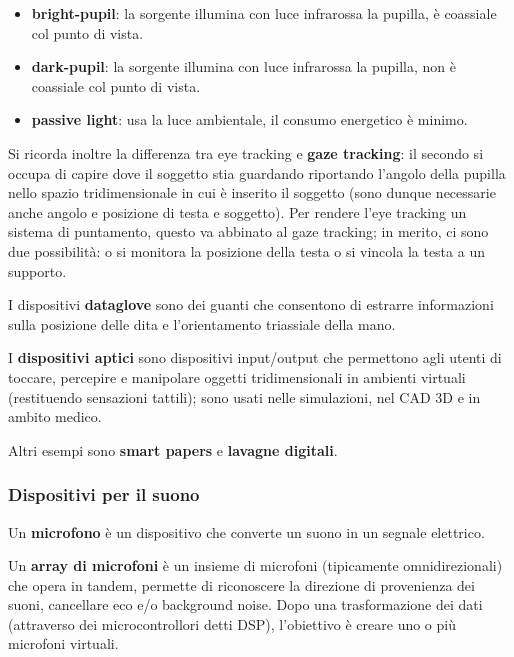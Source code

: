 \begin{itemize}
	\itemsep-0.3em
	\item \textbf{bright-pupil}: la sorgente illumina con luce infrarossa la pupilla, è coassiale col punto di vista.
	\item \textbf{dark-pupil}: la sorgente illumina con luce infrarossa la pupilla, non è coassiale col punto di vista.
	\item \textbf{passive light}: usa la luce ambientale, il consumo energetico è minimo.
\end{itemize}

Si ricorda inoltre la differenza tra eye tracking e \textbf{gaze tracking}: il secondo si occupa di capire dove il soggetto stia guardando
riportando l'angolo della pupilla nello spazio tridimensionale in cui è inserito il soggetto (sono dunque necessarie anche angolo e posizione
di testa e soggetto). Per rendere l'eye tracking un sistema di puntamento, questo va abbinato al gaze tracking; in merito, ci sono due
possibilità: o si monitora la posizione della testa o si vincola la testa a un supporto.

I dispositivi \textbf{dataglove} sono dei guanti che consentono di estrarre informazioni sulla posizione delle dita e l'orientamento triassiale
della mano.

I \textbf{dispositivi aptici} sono dispositivi input/output che permettono agli utenti di toccare, percepire e manipolare oggetti tridimensionali
in ambienti virtuali (restituendo sensazioni tattili); sono usati nelle simulazioni, nel CAD 3D e in ambito medico.

Altri esempi sono \textbf{smart papers} e \textbf{lavagne digitali}.

\subsubsection*{Dispositivi per il suono}
Un \textbf{microfono} è un dispositivo che converte un suono in un segnale elettrico.

Un \textbf{array di microfoni} è un insieme di microfoni (tipicamente omnidirezionali) che opera in tandem, permette di riconoscere la direzione
di provenienza dei suoni, cancellare eco e/o background noise. Dopo una trasformazione dei dati (attraverso dei microcontrollori detti DSP), l'obiettivo
è creare uno o più microfoni virtuali.